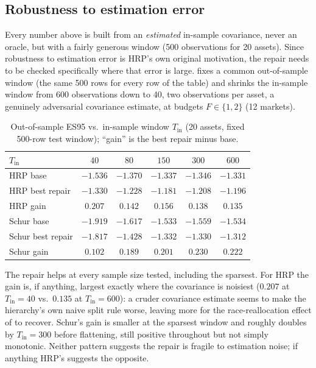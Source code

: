 \documentclass[11pt]{article}
\begin{document}
\subsection{Robustness to estimation error}
\label{sec:estnoise}

Every number above is built from an \emph{estimated} in-sample covariance,
never an oracle, but with a fairly generous window (500 observations for 20
assets). Since robustness to estimation error is HRP's own original
motivation, the repair needs to be checked specifically where that error is
large.  fixes a common out-of-sample window (the same 500
rows for every row of the table) and shrinks the in-sample window from 600
observations down to 40, two observations per asset, a genuinely adversarial
covariance estimate, at budgets $F\in\{1,2\}$ (12 markets).

\begin{table}[h]
\centering
\caption{Out-of-sample ES95 vs.\ in-sample window $T_{\mathrm{in}}$ (20 assets, fixed 500-row test window); ``gain'' is the best repair minus base.}
\label{tab:estnoise}
\small
\begin{tabular}{lccccc}
\toprule
$T_{\mathrm{in}}$ & $40$ & $80$ & $150$ & $300$ & $600$ \\
\midrule
HRP base            & $-1.536$ & $-1.370$ & $-1.337$ & $-1.346$ & $-1.331$ \\
HRP best repair      & $-1.330$ & $-1.228$ & $-1.181$ & $-1.208$ & $-1.196$ \\
HRP gain             & $0.207$  & $0.142$  & $0.156$  & $0.138$  & $0.135$ \\
\midrule
Schur base           & $-1.919$ & $-1.617$ & $-1.533$ & $-1.559$ & $-1.534$ \\
Schur best repair     & $-1.817$ & $-1.428$ & $-1.332$ & $-1.330$ & $-1.312$ \\
Schur gain           & $0.102$  & $0.189$  & $0.201$  & $0.230$  & $0.222$ \\
\bottomrule
\end{tabular}
\end{table}

The repair helps at every sample size tested, including the sparsest. For
HRP the gain is, if anything, largest exactly where the covariance is
noisiest ($0.207$ at $T_{\mathrm{in}}=40$ vs.\ $0.135$ at
$T_{\mathrm{in}}=600$): a cruder covariance estimate seems to make the
hierarchy's own naive split rule worse, leaving more for the
race-reallocation effect of  to recover. Schur's gain
is smaller at the sparsest window and roughly doubles by
$T_{\mathrm{in}}=300$ before flattening, still positive throughout but not
simply monotonic. Neither pattern suggests the repair is fragile to
estimation noise; if anything HRP's suggests the opposite.
\end{document}
